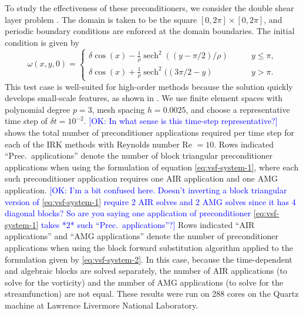 \documentclass[review]{siamart}
\newcommand{\OK}[1]{\textcolor{blue}{[OK: #1]}}
\begin{document}
To study the effectiveness of these preconditioners, we consider the double shear layer problem \cite{Bell1989}.
The domain is taken to be the square $[0,2\pi] \times [0,2\pi]$, and periodic boundary conditions are enforced at the domain boundaries.
The initial condition is given by
\[
	\omega(x,y,0) = \begin{cases}
		\delta \cos(x) - \frac{1}{\rho}\operatorname{sech}^2((y-\pi/2)/\rho) \qquad & y \leq \pi, \\
		\delta \cos(x) + \frac{1}{\rho}\operatorname{sech}^2((3\pi/2 - y) \qquad & y > \pi.
	\end{cases}
\]
This test case is well-suited for high-order methods because the solution quickly develops small-scale features, as shown in .
We use finite element spaces with polynomial degree $p=3$, mesh spacing $h = 0.0025$, and choose a representative time step of $\delta t = 10^{-2}$. 
%
\OK{In what sense is this time-step representative?}
%
 shows the total number of preconditioner applications required per time step for each of the IRK methods with Reynolds number Re  $=10$. Rows indicated ``Prec.\ applications'' denote the number of block triangular preconditioner applications when using the formulation of equation \eqref{eq:vsf-system-1}, where each such preconditioner application requires one AIR application and one AMG application. 
%
\OK{I'm a bit confused here. Doesn't inverting a block triangular version of \eqref{eq:vsf-system-1} require 2 AIR solves and 2 AMG solves since it has 4 diagonal blocks? So are you saying one application of preconditioner \eqref{eq:vsf-system-1} takes *2* such ``Prec.\ applications''?} 
%
Rows indicated ``AIR applications'' and ``AMG applications'' denote the number of preconditioner applications when using the block forward substitution algorithm applied to the formulation given by \eqref{eq:vsf-system-2}.
In this case, because the time-dependent and algebraic blocks are solved separately, the number of AIR applications (to solve for the vorticity) and the number of AMG applications (to solve for the streamfunction) are not equal. These results were run on 288 cores on the Quartz machine at Lawrence Livermore National Laboratory.
\end{document}
